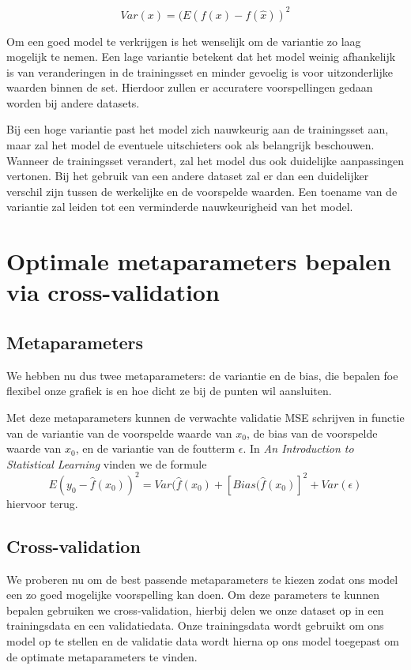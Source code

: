\documentclass[TeamE-eindrapport]{subfiles}
\begin{document}
	\[Var (x)= (E(f(x)- f(\hat{x}))^2\]
	
	Om een goed model te verkrijgen is het wenselijk om de variantie zo laag mogelijk te nemen. Een lage variantie betekent dat het model weinig afhankelijk is van veranderingen in de trainingsset en minder gevoelig is voor uitzonderlijke waarden binnen de set.  Hierdoor zullen er accuratere voorspellingen gedaan worden bij andere datasets.
	
	Bij een hoge variantie past het model zich nauwkeurig aan de trainingsset aan, maar zal het model de eventuele uitschieters ook als belangrijk beschouwen. Wanneer de trainingsset verandert, zal het model dus ook duidelijke aanpassingen vertonen.  Bij het gebruik van een andere dataset zal er dan  een duidelijker verschil zijn tussen de werkelijke en de voorspelde waarden. Een toename van de variantie zal leiden tot een verminderde nauwkeurigheid van het model.
	
	\section{Optimale metaparameters bepalen via cross-validation}
	
	\subsection{Metaparameters}
	
	We hebben nu dus twee metaparameters: de variantie en de bias, die bepalen foe flexibel onze grafiek is en hoe dicht ze bij de punten wil aansluiten.	
	
	Met deze metaparameters kunnen de verwachte validatie MSE schrijven in functie van de variantie van de voorspelde waarde van \(x_{0}\), de bias van de voorspelde waarde van \(x_{0}\), en de variantie van de foutterm \(\epsilon\). In \textit{An Introduction to Statistical Learning} \cite{james2023introduction} vinden we de formule \[E(y_{0} - \hat{f}(x_{0}))^{2} = Var(\hat{f}(x_{0}) + [Bias(\hat{f}(x_{0})]^{2} + Var(\epsilon)\] hiervoor terug.
	
	\subsection{Cross-validation}
	
	We proberen nu om de best passende metaparameters te kiezen zodat ons model een zo goed mogelijke voorspelling kan doen. Om deze parameters te kunnen bepalen gebruiken we cross-validation, hierbij delen we onze dataset op in een trainingsdata en een validatiedata. Onze trainingsdata wordt gebruikt om ons model op te stellen en de validatie data wordt hierna op ons model toegepast om de optimate metaparameters te vinden. 
	
\end{document}
